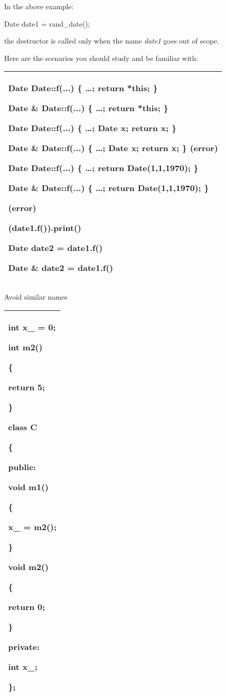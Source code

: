 \documentclass[
]{article}
\begin{document}
In the above example:

Date date1 = rand\_date();

the destructor is called only when the name \emph{date1} goes out of
scope.

Here are the scenarios you should study and be familiar with:

\begin{longtable}[]{@{}l@{}}
\toprule
\endhead
\begin{minipage}[t]{0.97\columnwidth}\raggedright
Date Date::f(...) \{ \ldots; return *this; \}

Date \& Date::f(...) \{ \ldots; return *this; \}

Date Date::f(...) \{ \ldots; Date x; return x; \}

Date \& Date::f(...) \{ \ldots; Date x; return x; \} (error)

Date Date::f(...) \{ \ldots; return Date(1,1,1970); \}

Date \& Date::f(...) \{ \ldots; return Date(1,1,1970); \}

(error)

(date1.f()).print()

Date date2 = date1.f()

Date \& date2 = date1.f()\strut
\end{minipage}\tabularnewline
\bottomrule
\end{longtable}

Avoid similar names

\begin{longtable}[]{@{}l@{}}
\toprule
\endhead
\begin{minipage}[t]{0.97\columnwidth}\raggedright
int x\_ = 0;

int m2()

\{

return 5;

\}

class C

\{

public:

void m1()

\{

x\_ = m2();

\}

void m2()

\{

return 0;

\}

private:

int x\_;

\};\strut
\end{minipage}\tabularnewline
\bottomrule
\end{longtable}
\end{document}
